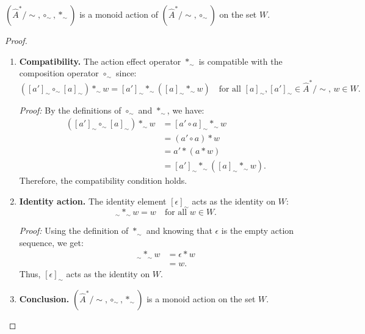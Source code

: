 \begin{proposition}
    $(\hat{A}^{\ast}/\sim, \circ_{\sim}, \ast_{\sim})$ is a monoid action of $(\hat{A}^{\ast}/\sim, \circ_{\sim})$ on the set $W$.
\end{proposition}

\begin{proof}
    \begin{enumerate}[(1)]
        \item \textbf{Compatibility.}
              The action effect operator $\ast_{\sim}$ is compatible with the composition operator $\circ_{\sim}$ since:
              \begin{equation}
                  ([a']_{\sim} \circ_{\sim} [a]_{\sim}) \ast_{\sim} w = [a']_{\sim} \ast_{\sim} ([a]_{\sim} \ast_{\sim} w) \quad \text{for all } [a]_{\sim}, [a']_{\sim} \in \hat{A}^{\ast}/\sim, \, w \in W.
              \end{equation}

              \textit{Proof:} By the definitions of $\circ_{\sim}$ and $\ast_{\sim}$, we have:
              \begin{align}
                  ([a']_{\sim} \circ_{\sim} [a]_{\sim}) \ast_{\sim} w & = [a' \circ a]_{\sim} \ast_{\sim} w                   \\
                                                                      & = (a' \circ a) \ast w                                 \\
                                                                      & = a' \ast (a \ast w)                                  \\
                                                                      & = [a']_{\sim} \ast_{\sim} ([a]_{\sim} \ast_{\sim} w).
              \end{align}
              Therefore, the compatibility condition holds.

        \item \textbf{Identity action.}
              The identity element $[\epsilon]_{\sim}$ acts as the identity on $W$:
              \begin{equation}
                  [\epsilon]_{\sim} \ast_{\sim} w = w \quad \text{for all } w \in W.
              \end{equation}

              \textit{Proof:} Using the definition of $\ast_{\sim}$ and knowing that $\epsilon$ is the empty action sequence, we get:
              \begin{align}
                  [\epsilon]_{\sim} \ast_{\sim} w & = \epsilon \ast w \\
                                                  & = w.
              \end{align}
              Thus, $[\epsilon]_{\sim}$ acts as the identity on $W$.

        \item \textbf{Conclusion.}
              $(\hat{A}^{\ast}/\sim, \circ_{\sim}, \ast_{\sim})$ is a monoid action on the set $W$.
    \end{enumerate}
\end{proof}


